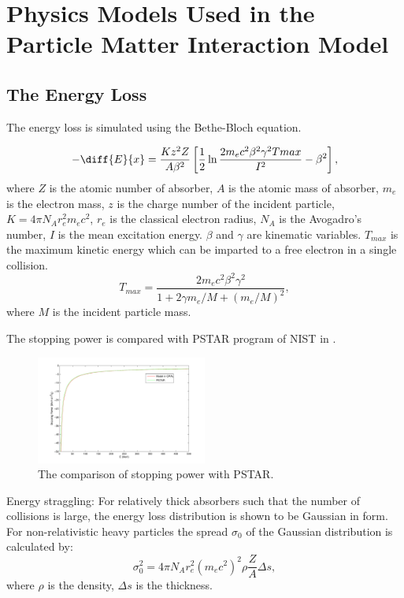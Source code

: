 

\chapter{Physics Models Used in the Particle Matter Interaction Model}
\label{chp:partmatt}

\section{The Energy Loss}

The energy loss is simulated using the Bethe-Bloch equation.

\begin{equation}
\label{eq:dEdx}
-\diff{E}{x}=\frac{K z^2 Z}{A \beta^2}\left[\frac{1}{2} \ln{\frac{2 m_e c^2\beta^2 \gamma^2 Tmax}{I^2}}-\beta^2 \right],
\end{equation}
where $Z$ is the atomic number of absorber, $A$ is the atomic mass of absorber, $m_e$ is the electron mass, $z$ is the charge number of the incident particle, $K=4\pi N_Ar_e^2m_ec^2$, $r_e$ is the classical electron radius, $N_A$ is the Avogadro's number, $I$ is the mean excitation energy. $\beta$ and $\gamma$ are kinematic variables. $T_{max}$ is the maximum kinetic energy which can be imparted to a free electron in a single collision.
\begin{equation}
T_{max}=\frac{2m_ec^2\beta^2\gamma^2}{1+2\gamma m_e/M+(m_e/M)^2},
\end{equation}
where $M$ is the incident particle mass.

The stopping power is compared with PSTAR program of NIST in .
\begin{figure}[h!]
\begin{center}
\includegraphics[width=0.5\textwidth]{figures/partmatter/dEdx}
\end{center}
\caption{The comparison of stopping power with PSTAR. }
\label{fig:dEdx}
\end{figure}

Energy straggling: For relatively thick absorbers such that the number of collisions is large, the energy loss distribution is shown to be Gaussian in form.
For non-relativistic heavy particles the spread $\sigma_0$ of the Gaussian distribution is calculated by:
\begin{equation}
\sigma_0^2=4\pi N_Ar_e^2(m_ec^2)^2\rho\frac{Z}{A}\Delta s,
\end{equation}
where $\rho$ is the density, $\Delta s$ is the thickness.

